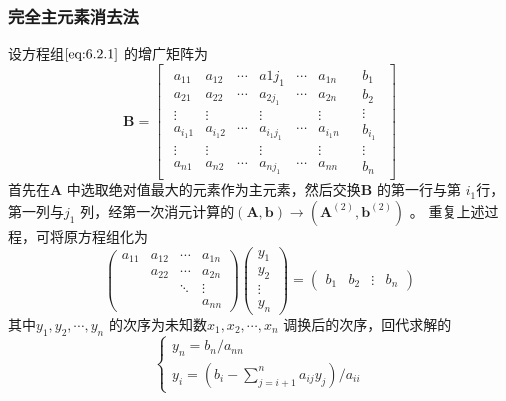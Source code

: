 \documentclass[a4paper]{article}
\begin{document}
\subsubsection{完全主元素消去法}
设方程组$\ref{eq:6.2.1}$ 的增广矩阵为
\[
	\mathbf{B} = 
	\left[ 
	\begin{array}{c|c}
		\begin{matrix} 
			a_{11} & a_{12} & \cdots & a{1j_1} & \cdots & a_{1n} \\
			a_{21} & a_{22} & \cdots & a_{2j_1} & \cdots & a_{2n} \\
			\vdots & \vdots & & \vdots & & \vdots \\
			a_{i_1 1} & a_{i_1 2} & \cdots & a_{i_1 j_1} & \cdots & a_{i_1 n} \\
			\vdots & \vdots & & \vdots & & \vdots \\
			a_{n1} & a_{n2} & \cdots & a_{n j_1} & \cdots & a_{nn}
		\end{matrix} &
		\begin{matrix} b_1 \\ b_2 \\ \vdots \\ b_{i_1} \\ \vdots \\ b_n \end{matrix} 
	\end{array}
	\right] 
\] 
首先在$\mathbf{A}$ 中选取绝对值最大的元素作为主元素，然后交换$\mathbf{B}$ 的第一行与第 $i_1$行，第一列与$j_1$ 列，经第一次消元计算的$(\mathbf{A}, \mathbf{b}) \to (\mathbf{A}^{(2)}, \mathbf{b}^{(2)})$ 。
重复上述过程，可将原方程组化为
\[
	\begin{pmatrix} 
		a_{11} & a_{12} & \cdots & a_{1n} \\
		       & a_{22} & \cdots & a_{2n} \\
		       & & \ddots & \vdots \\
		       & & & a_{nn}
	\end{pmatrix} 
	\begin{pmatrix} y_1 \\ y_2 \\ \vdots \\ y_{n} \end{pmatrix} =
	\begin{pmatrix} b_1 & b_2 & \vdots & b_n \end{pmatrix} 
\] 
其中$y_1,y_2,\cdots,y_{n}$ 的次序为未知数$x_1, x_2, \cdots, x_{n}$ 调换后的次序，回代求解的
\[
\begin{cases}
	y_{n} = b_n / a_{nn} \\
	y_{i} = (b_i - \sum_{j=i+1}^{n} a_{ij} y_{j}) / a_{ii}
\end{cases} 
\] 
\end{document}
